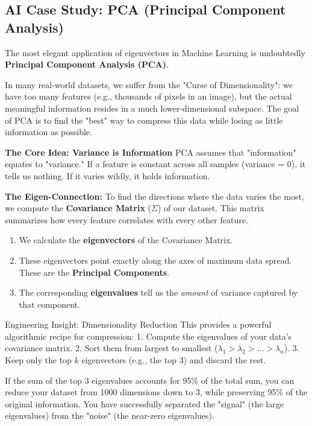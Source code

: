 \subsection{AI Case Study: PCA (Principal Component Analysis)}

The most elegant application of eigenvectors in Machine Learning is undoubtedly \textbf{Principal Component Analysis (PCA)}.

In many real-world datasets, we suffer from the "Curse of Dimensionality": we have too many features (e.g., thousands of pixels in an image), but the actual meaningful information resides in a much lower-dimensional subspace.
The goal of PCA is to find the "best" way to compress this data while losing as little information as possible.

\textbf{The Core Idea: Variance is Information}
PCA assumes that "information" equates to "variance." If a feature is constant across all samples (variance = 0), it tells us nothing. If it varies wildly, it holds information.

\textbf{The Eigen-Connection:}
To find the directions where the data varies the most, we compute the \textbf{Covariance Matrix} ($\Sigma$) of our dataset. This matrix summarizes how every feature correlates with every other feature.
\begin{enumerate}
    \item We calculate the \textbf{eigenvectors} of the Covariance Matrix.
    \item These eigenvectors point exactly along the axes of maximum data spread. These are the \textbf{Principal Components}.
    \item The corresponding \textbf{eigenvalues} tell us the \textit{amount} of variance captured by that component.
\end{enumerate}

\begin{unibobox}{Engineering Insight: Dimensionality Reduction}
This provides a powerful algorithmic recipe for compression:
1. Compute the eigenvalues of your data's covariance matrix.
2. Sort them from largest to smallest ($\lambda_1 > \lambda_2 > \dots > \lambda_n$).
3. Keep only the top $k$ eigenvectors (e.g., the top 3) and discard the rest.

If the sum of the top 3 eigenvalues accounts for 95\% of the total sum, you can reduce your dataset from 1000 dimensions down to 3, while preserving 95\% of the original information. You have successfully separated the "signal" (the large eigenvalues) from the "noise" (the near-zero eigenvalues).
\end{unibobox}

